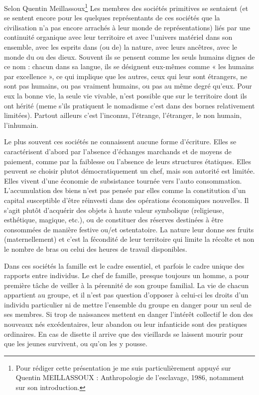 Selon Quentin Meillassoux\footnote{Pour rédiger cette présentation je me suis particulièrement appuyé sur Quentin MEILLASSOUX : Anthropologie de l'esclavage, 1986, notamment sur son introduction.} Les membres des sociétés primitives se sentaient (et se sentent encore pour les quelques représentants de ces sociétés que la civilisation n'a pas encore arrachés à leur monde de représentations) liés par une continuité organique avec leur territoire et avec l'univers matériel dans son ensemble, avec les esprits dans (ou de) la nature, avec leurs ancêtres, avec le monde du ou des dieux. Souvent ils se pensent comme les seuls humains dignes de ce nom : chacun dans sa langue, ils se désignent eux-mêmes comme « les humains par excellence », ce qui implique que les autres, ceux qui leur sont étrangers, ne sont pas humains, ou pas vraiment humains, ou pas au même degré qu’eux. Pour eux la bonne vie, la seule vie vivable, n'est possible que sur le territoire dont ils ont hérité (meme s'ils pratiquent le nomadisme c'est dans des bornes relativement limitées). Partout ailleurs c'est l'inconnu, l'étrange, l'étranger, le non humain, l'inhumain.


Le plus souvent ces sociétés ne connaissent aucune forme d'écriture. Elles se caractérisent d'abord par l'absence d'échanges marchands et de moyens de paiement, comme par la faiblesse ou l'absence de leurs structures étatiques. Elles peuvent se choisir plutot démocratiquement un chef, mais son autorité est limitée. Elles vivent d'une économie de subsistance tournée vers l'auto consommation. L'accumulation des biens n'est pas pensée par elles comme la constitution d'un capital susceptible d'être réinvesti dans des opérations économiques nouvelles. Il s'agit plutôt d'acquérir des objets à haute valeur symbolique (religieuse, esthétique, magique, etc.), ou de constituer des réserves destinées à être consommées de manière festive ou/et ostentatoire. La nature leur donne ses fruits (maternellement) et c'est la fécondité de leur territoire qui limite la récolte et non le nombre de bras ou celui des heures de travail disponibles.


Dans ces sociétés la famille est le cadre essentiel, et parfois le cadre unique des rapports entre individus. Le chef de famille, presque toujours un homme, a pour première tâche de veiller à la pérennité de son groupe familial. La vie de chacun appartient au groupe, et il n'est pas question d'opposer à celui-ci les droits d'un individu particulier ni de mettre l'ensemble du groupe en danger pour un seul de ses membres. Si trop de naissances mettent en danger l'intérêt collectif le don des nouveaux nés excédentaires, leur abandon ou leur infanticide sont des pratiques ordinaires. En cas de disette il arrive que des vieillards se laissent mourir pour que les jeunes survivent, ou qu'on les y pousse.

